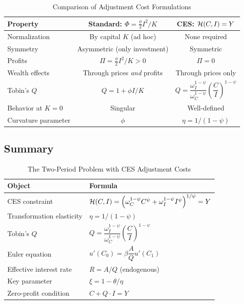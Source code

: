 \begin{table}[H]
\centering
\caption{Comparison of Adjustment Cost Formulations}
\label{tab:ac-comparison}
\renewcommand{\arraystretch}{1.5}
\begin{tabular}{@{}lcc@{}}
\toprule
\textbf{Property} & \textbf{Standard: $\Phi = \frac{\phi}{2} I^2/K$} & \textbf{CES: $\mathcal{H}(C,I) = Y$} \\
\midrule
Normalization & By capital $K$ (ad hoc) & None required \\[4pt]
Symmetry & Asymmetric (only investment) & Symmetric \\[4pt]
Profits & $\Pi = \frac{\phi}{2} I^2/K > 0$ & $\Pi = 0$ \\[4pt]
Wealth effects & Through prices \emph{and} profits & Through prices only \\[4pt]
Tobin's $Q$ & $Q = 1 + \phi I/K$ & $Q = \dfrac{\omega_I^{1-\psi}}{\omega_C^{1-\psi}} \left( \dfrac{C}{I} \right)^{1-\psi}$ \\[10pt]
Behavior at $K = 0$ & Singular & Well-defined \\[4pt]
Curvature parameter & $\phi$ & $\eta = 1/(1-\psi)$ \\[4pt]
\bottomrule
\end{tabular}
\end{table}

\subsection{Summary}
\label{subsec:ac-two-period-summary}

\begin{table}[H]
\centering
\caption{The Two-Period Problem with CES Adjustment Costs}
\label{tab:ac-two-period-summary}
\renewcommand{\arraystretch}{1.6}
\begin{tabular}{@{}ll@{}}
\toprule
\textbf{Object} & \textbf{Formula} \\
\midrule
CES constraint & $\mathcal{H}(C, I) = \left( \omega_C^{1-\psi} C^{\psi} + \omega_I^{1-\psi} I^{\psi} \right)^{1/\psi} = Y$ \\[6pt]
Transformation elasticity & $\eta = 1/(1-\psi)$ \\[6pt]
Tobin's $Q$ & $Q = \dfrac{\omega_I^{1-\psi}}{\omega_C^{1-\psi}} \left( \dfrac{C}{I} \right)^{1-\psi}$ \\[10pt]
Euler equation & $u'(C_0) = \beta \dfrac{A}{Q} u'(C_1)$ \\[8pt]
Effective interest rate & $R = A/Q$ (endogenous) \\[6pt]
Key parameter & $\xi = 1 - \theta/\eta$ \\[6pt]
Zero-profit condition & $C + Q \cdot I = Y$ \\[6pt]
\bottomrule
\end{tabular}
\end{table}

